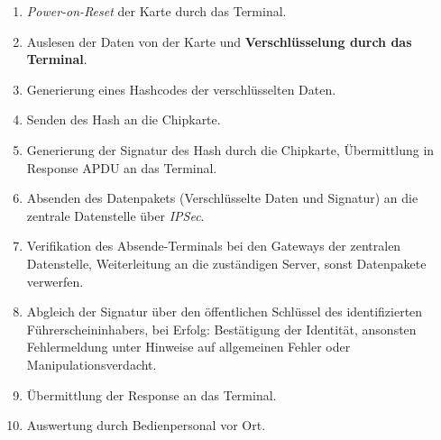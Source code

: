 \begin{enumerate}
    \itemsep0.5em
    \item \textit{Power-on-Reset} der Karte durch das Terminal.
    \item Auslesen der Daten von der Karte und \textbf{Verschlüsselung durch das Terminal}.
    \item Generierung eines Hashcodes der verschlüsselten Daten.
    \item Senden des Hash an die Chipkarte.
    \item Generierung der Signatur des Hash durch die Chipkarte, Übermittlung in Response APDU an das Terminal.
    \item Absenden des Datenpakets (Verschlüsselte Daten und Signatur) an die zentrale Datenstelle über \textit{IPSec}.
    \item Verifikation des Absende-Terminals bei den Gateways der zentralen Datenstelle, Weiterleitung an die zuständigen Server, sonst Datenpakete verwerfen.
    \item Abgleich der Signatur über den öffentlichen Schlüssel des identifizierten Führerscheininhabers, bei Erfolg: Bestätigung der Identität, ansonsten Fehlermeldung unter Hinweise auf allgemeinen Fehler oder Manipulationsverdacht.
    \item Übermittlung der Response an das Terminal.
    \item Auswertung durch Bedienpersonal vor Ort.
\end{enumerate}